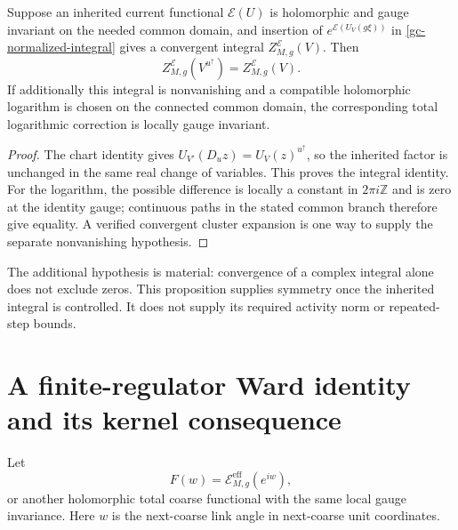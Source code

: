\begin{proposition}
\label{gc-inherited}
Suppose an inherited current functional $\mathcal E(U)$ is
holomorphic and gauge invariant on the needed common domain,
and insertion of $e^{\mathcal E(U_V(g\xi))}$ in
\eqref{gc-normalized-integral} gives a convergent integral
$Z_{M,g}^{\mathcal E}(V)$. Then
\begin{equation}\label{gc-inherited-integral}
 Z_{M,g}^{\mathcal E}(V^{u^\uparrow})
                          =Z_{M,g}^{\mathcal E}(V).
\end{equation}
If additionally this integral is nonvanishing and a compatible
holomorphic logarithm is chosen on the connected common domain,
the corresponding total logarithmic correction is locally
gauge invariant.
\end{proposition}
\begin{proof}
The chart identity gives
$U_{V'}(D_uz)=U_V(z)^{u^\uparrow}$, so the inherited factor is
unchanged in the same real change of variables. This proves
the integral identity. For the logarithm, the possible difference
is locally a constant in $2\pi i\mathbb Z$ and is zero at the
identity gauge; continuous paths in the stated common branch
therefore give equality. A verified convergent cluster expansion
is one way to supply the separate nonvanishing hypothesis.
\end{proof}
The additional hypothesis is material: convergence of a complex
integral alone does not exclude zeros. This proposition supplies
symmetry once the inherited integral is controlled. It does not
supply its required activity norm or repeated-step bounds.

\section{A finite-regulator Ward identity and its kernel consequence}
\label{gc-ward-section}

Let
\begin{equation}\label{gc-f}
 F(w)=\mathcal E_{M,g}^{\mathrm{eff}}(e^{iw}),
\end{equation}
or another holomorphic total coarse functional with the same
local gauge invariance. Here $w$ is the next-coarse link angle
in next-coarse unit coordinates.

